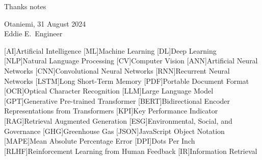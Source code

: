 \documentclass[english, 12pt, a4paper, elec, utf8, a-2b, online]{aaltothesis}
\begin{document}

\newpage

\dothesispagenumbering{}


Thanks notes

\vspace{5cm}
Otaniemi, 31 August 2024\\

\vspace{5mm}
{\hfill Eddie E.\ Engineer \hspace{1cm}}

\newpage


\thesistableofcontents

\cleardoublepage

\newpage

[AI]{Artificial Intelligence}
[ML]{Machine Learning}
[DL]{Deep Learning}
[NLP]{Natural Language Processing}
[CV]{Computer Vision}
[ANN]{Artificial Neural Networks}
[CNN]{Convolutional Neural Networks}
[RNN]{Recurrent Neural Networks}
[LSTM]{Long Short-Term Memory}
[PDF]{Portable Document Format}
[OCR]{Optical Character Recognition}
[LLM]{Large Language Model}
[GPT]{Generative Pre-trained Transformer}
[BERT]{Bidirectional Encoder Representations from Transformers}
[KPI]{Key Performance Indicator}
[RAG]{Retrieval Augmented Generation}
[ESG]{Environmental, Social, and Governance}
[GHG]{Greenhouse Gas}
[JSON]{JavaScript Object Notation}
[MAPE]{Mean Absolute Percentage Error}
[DPI]{Dots Per Inch}
[RLHF]{Reinforcement Learning from Human Feedback}
[IR]{Information Retrieval}
\end{document}
